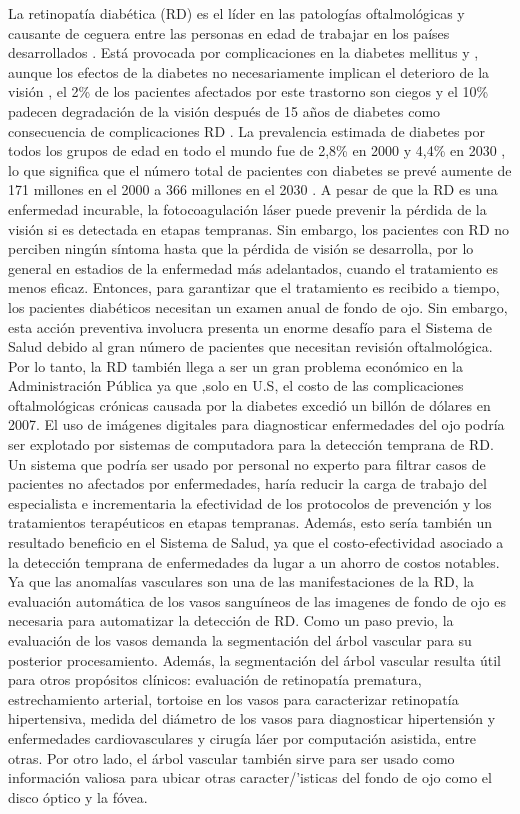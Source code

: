 La retinopat\'ia diab\'etica (RD) es el l\'ider en las patolog\'ias oftalmol\'ogicas y causante de ceguera entre las personas en edad de trabajar en los pa\'ises desarrollados . Est\'a provocada por complicaciones en la diabetes mellitus y , aunque los efectos de la diabetes no necesariamente implican el deterioro de la visión , el 2\% de los pacientes afectados por este trastorno son ciegos y el 10\% padecen  degradaci\'on de la visi\'on despu\'es de 15 años de diabetes como consecuencia de complicaciones RD . La prevalencia estimada de diabetes por todos los grupos de edad en todo el mundo fue de 2,8\% en 2000 y 4,4\% en 2030 , lo que significa que el n\'umero total de pacientes con diabetes se prev\'e aumente de 171 millones en el  2000 a 366 millones en el 2030 .
	A pesar de que la RD es una enfermedad incurable, la fotocoagulaci\'on l\'aser puede prevenir la p\'erdida de la visi\'on si es detectada en etapas tempranas. Sin embargo, los pacientes con RD no perciben ning\'un s\'intoma hasta que la p\'erdida de visi\'on se desarrolla, por lo general en estadios de la enfermedad más adelantados, cuando el tratamiento es menos eficaz. Entonces, para garantizar que el tratamiento es recibido a tiempo, los pacientes diab\'eticos necesitan un examen anual de fondo de ojo. Sin embargo, esta acci\'on preventiva involucra presenta un enorme desaf\'io para el Sistema de Salud debido  al gran n\'umero de pacientes que necesitan revisi\'on oftalmológica. Por lo tanto, la RD tambi\'en llega a ser un gran problema econ\'omico en la  Administraci\'on P\'ublica ya que ,solo en U.S, el costo de las complicaciones oftalmol\'ogicas cr\'onicas causada por la diabetes excedi\'o un bill\'on de d\'olares en 2007.
El uso de im\'agenes digitales para diagnosticar enfermedades del ojo podr\'ia ser explotado por sistemas de computadora para la detecci\'on temprana de RD. Un sistema que podr\'ia ser  usado por personal no experto para filtrar casos de pacientes no afectados por enfermedades, har\'ia reducir la carga de trabajo del especialista e incrementaria la efectividad de los protocolos de prevenci\'on y los tratamientos terap\'euticos en etapas tempranas. Adem\'as, esto ser\'ia tambi\'en un resultado beneficio en el Sistema de Salud, ya que el costo-efectividad asociado a la detecci\'on temprana de enfermedades da lugar a un ahorro de costos notables.
Ya que las anomal\'ias vasculares son una de las manifestaciones de la RD, la evaluaci\'on autom\'atica de los vasos sangu\'ineos de las imagenes de fondo de ojo es necesaria para automatizar la detecci\'on de RD. Como un paso previo, la evaluaci\'on de los vasos demanda la segmentaci\'on del \'arbol vascular para su posterior procesamiento. Adem\'as, la segmentaci\'on del \'arbol vascular resulta \'util para otros prop\'ositos cl\'inicos: evaluaci\'on de retinopat\'ia prematura, estrechamiento arterial, tortoise en los vasos para caracterizar retinopat\'ia hipertensiva, medida del di\'ametro de los vasos para diagnosticar hipertensi\'on y enfermedades cardiovasculares y cirug\'ia l\'aer por computaci\'on asistida, entre otras.
Por otro lado, el \'arbol vascular tambi\'en sirve para ser usado como informaci\'on valiosa para ubicar otras caracter/'isticas del fondo de ojo como el disco \'optico y la f\'ovea. \cite{marin2011new}


